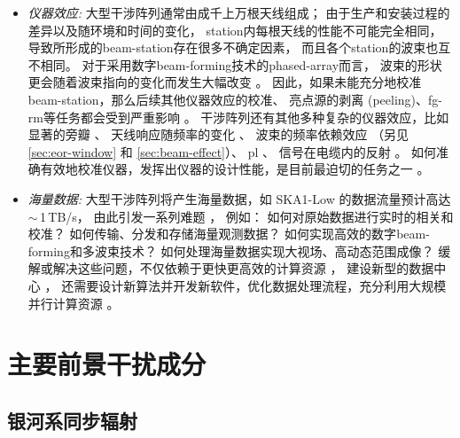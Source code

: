 \begin{itemize}
\item
\emph{仪器效应:}
大型干涉阵列通常由成千上万根天线组成；
由于生产和安装过程的差异以及随环境和时间的变化，
\ac{station}内每根天线的性能不可能完全相同，
导致所形成的\ac{beam-station}存在很多不确定因素，
而且各个\ac{station}的波束也互不相同。
对于采用数字\ac{beam-forming}技术的\ac{phased-array}而言，
波束的形状更会随着波束指向的变化而发生大幅改变
\cite{smirnov2011iii,vanWeeren2016,jagannathan2017}。
因此，如果未能充分地校准\ac{beam-station}，那么后续其他仪器效应的校准、
亮点源的剥离 (peeling)、\ac{fg-rm}等任务都会受到严重影响
\cite{noordam2004,neben2016}。
干涉阵列还有其他多种复杂的仪器效应，比如
显著的旁瓣 \cite{thyagarajan2015,mort2017}、
天线响应随频率的变化 \cite{bernardi2015,trott2017}、
波束的频率依赖效应 \cite{liu2009ps,datta2010,morales2012}
（另见 \autoref{sec:eor-window} 和 \autoref{sec:beam-effect}）、
\ac{pl} \cite{asad2015,asad2016,asad2018,lenc2017}、
信号在电缆内的反射 \cite{beardsley2016}。
如何准确有效地校准仪器，发挥出仪器的设计性能，是目前最迫切的任务之一
\cite{noordam2004,mitchell2008,wijnholds2010,barry2016,dillon2016}。

\item
\emph{海量数据:}
大型干涉阵列将产生海量数据，如 SKA1-Low 的数据流量预计高达 $\sim$\,1\,TB/s，
由此引发一系列难题 \cite{norris2011,dolensky2016,chrysostomou2018}，
例如：
如何对原始数据进行实时的相关和校准？
如何传输、分发和存储海量观测数据？
如何实现高效的数字\ac{beam-forming}和多波束技术？
如何处理海量数据实现大视场、高动态范围成像？
缓解或解决这些问题，不仅依赖于更快更高效的计算资源 \cite{magro2014,vermij2017}，
建设新型的数据中心 \cite{chrysostomou2018}，
还需要设计新算法并开发新软件，优化数据处理流程，充分利用大规模并行计算资源
\cite{morales2009,bonaldi2018,farnes2018,gunst2018}。

\end{itemize}


\section{主要前景干扰成分}
\label{sec:fg-intro}

\subsection{银河系同步辐射}

